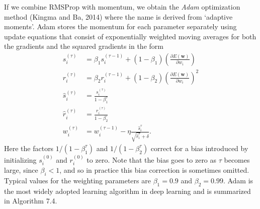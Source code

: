 \documentclass{article}
\begin{document}
If we combine RMSProp with momentum, we obtain the \emph{Adam} optimization method (Kingma and Ba, 2014) where the name is derived from `adaptive moments'. Adam stores the momentum for each parameter separately using update equations that consist of exponentially weighted moving averages for both the gradients and the squared gradients in the form
\begin{align}
s_i^{(\tau)} &= \beta_1 s_i^{(\tau-1)} + (1 - \beta_1) \left(\frac{\partial E(\mathbf{w})}{\partial w_i}\right) \tag{7.43} \\
r_i^{(\tau)} &= \beta_2 r_i^{(\tau-1)} + (1 - \beta_2) \left(\frac{\partial E(\mathbf{w})}{\partial w_i}\right)^2 \tag{7.44} \\
\widehat{s}_i^{(\tau)} &= \frac{s_i^{(\tau)}}{1 - \beta_1^\tau} \tag{7.45} \\
\widehat{r}_i^{(\tau)} &= \frac{r_i^{(\tau)}}{1 - \beta_2^\tau} \tag{7.46} \\
w_i^{(\tau)} &= w_i^{(\tau-1)} - \eta \frac{\widehat{s}_i^{\tau}}{\sqrt{\widehat{r}_i^{\tau}} + \delta}. \tag{7.47}
\end{align}
Here the factors $1/(1 - \beta_1^\tau)$ and $1/(1 - \beta_2^\tau)$ correct for a bias introduced by initializing $s_i^{(0)}$ and $r_i^{(0)}$ to zero. Note that the bias goes to zero as $\tau$ becomes large, since $\beta_i < 1$, and so in practice this bias correction is sometimes omitted. Typical values for the weighting parameters are $\beta_1 = 0.9$ and $\beta_2 = 0.99$. Adam is the most widely adopted learning algorithm in deep learning and is summarized in Algorithm 7.4.
\end{document}
